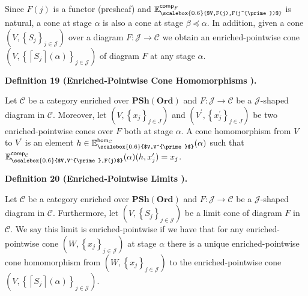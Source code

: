  
 
 
Since $F(j)$ is a functor (presheaf) and $\mathbb{E}^{\mathsf{comp}_{F}}_{\scalebox{0.6}{$V,F(j),F(j^{\prime})$}}$ is natural, a cone at stage $\alpha$ is also a cone at stage $\beta\preceq\alpha$. In addition, given a cone $(V,\left\{S_{j}\right\}_{j\in\mathcal{J}})$ over a diagram $F:\mathcal{J}\to\mathcal{C}$ we obtain an enriched-pointwise cone $(V,\left\{\left\lceil{S_{j}}\right\rceil(\alpha)\right\}_{j\in\mathcal{J}})$ of diagram $F$ at any stage $\alpha$.\par
 
 
 
\par\medskip\noindent\textbf{Definition 19 (Enriched-Pointwise Cone Homomorphisms ).}\par
 
 
Let $\mathcal{C}$ be a category enriched over $\mathbf{PSh}(\mathbf{Ord})$ and $F:\mathcal{J}\to\mathcal{C}$ be a $\mathcal{J}$-shaped diagram in $\mathcal{C}$. Moreover, let $(V,\left\{x_{j}\right\}_{j\in J})$ and $(V^{\prime},\left\{x^{\prime}_{j}\right\}_{j\in J})$ be two enriched-pointwise cones over $F$ both at stage $\alpha$. A cone homomorphism from $V$ to $V^{\prime}$ is an element $h\in\mathbb{E}^{\mathsf{hom}_{\mathcal{C}}}_{\scalebox{0.6}{$V,V^{\prime}$}}(\alpha)$ such that $\mathbb{E}^{\mathsf{comp}_{\mathcal{C}}}_{\scalebox{0.6}{$V,V^{\prime},F(j)$}}(\alpha)(h,x^{\prime}_{j})=x_{j}$.\par
 
 
 
 
\par\medskip\noindent\textbf{Definition 20 (Enriched-Pointwise Limits ).}\par
 
 
Let $\mathcal{C}$ be a category enriched over $\mathbf{PSh}(\mathbf{Ord})$ and $F:\mathcal{J}\to\mathcal{C}$ be a $\mathcal{J}$-shaped diagram in $\mathcal{C}$. Furthermore, let $(V,\left\{S_{j}\right\}_{j\in\mathcal{J}})$ be a limit cone of diagram $F$ in $\mathcal{C}$. We say this limit is enriched-pointwise if we have that for any enriched-pointwise cone $(W,\left\{x_{j}\right\}_{j\in\mathcal{J}})$ at stage $\alpha$ there is a unique enriched-pointwise cone homomorphism from $(W,\left\{x_{j}\right\}_{j\in\mathcal{J}})$ to the enriched-pointwise cone $(V,\left\{\left\lceil{S_{j}}\right\rceil(\alpha)\right\}_{j\in\mathcal{J}})$.\par
 
